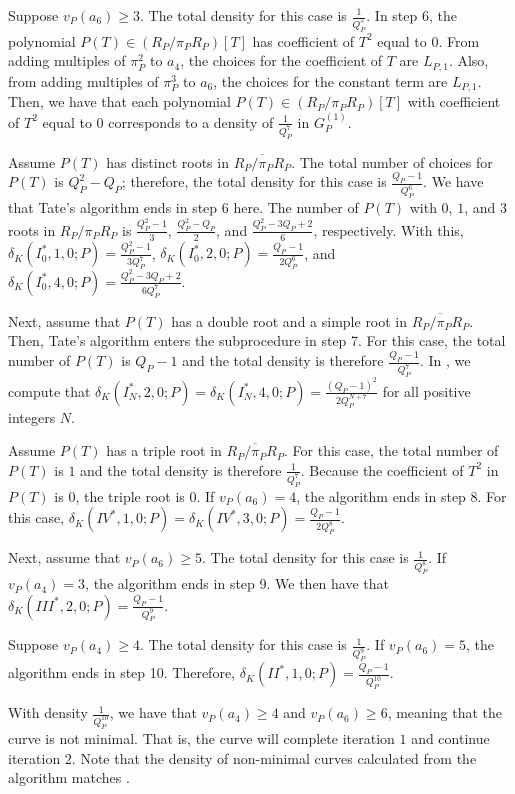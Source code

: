 \documentclass[12pt,letterpaper]{amsart}
\theoremstyle{definition}
\begin{document}
Suppose $v_P(a_6)\geq 3$. The total density for this case is $\frac{1}{Q_P^5}$. In step 6, the polynomial $P(T)\in (R_P/\pi_PR_P)[T]$ has coefficient of $T^2$ equal to $0$. From adding multiples of $\pi_P^2$ to $a_4$, the choices for the coefficient of $T$ are $L_{P,1}$. Also, from adding multiples of $\pi_P^3$ to $a_6$, the choices for the constant term are $L_{P,1}$. Then, we have that each polynomial $P(T)\in (R_P/\pi_PR_P)[T]$ with coefficient of $T^2$ equal to $0$ corresponds to a density of $\frac{1}{Q_P^7}$ in $G_P^{(1)}$.

Assume $P(T)$ has distinct roots in $\overline{R_P/\pi_P R_P}$. The total number of choices for $P(T)$ is $Q_P^2-Q_P$; therefore, the total density for this case is $\frac{Q_P-1}{Q_P^6}$. We have that Tate's algorithm ends in step 6 here. The number of $P(T)$ with $0$, $1$, and $3$ roots in $R_P/\pi_P R_P$ is $\frac{Q_P^2-1}{3}$, $\frac{Q_P^2-Q_P}{2}$, and $\frac{Q_P^2-3Q_P+2}{6}$, respectively. With this, $\delta_K(I_0^*, 1, 0; P)=\frac{Q_P^2-1}{3Q_P^7}$, $\delta_K(I_0^*, 2, 0; P)=\frac{Q_P-1}{2Q_P^6}$, and $\delta_K(I_0^*, 4, 0; P)=\frac{Q_P^2-3Q_P+2}{6Q_P^7}$.

Next, assume that $P(T)$ has a double root and a simple root in $\overline{R_P/\pi_P R_P}$. Then, Tate's algorithm enters the subprocedure in step 7. For this case, the total number of $P(T)$ is $Q_P-1$ and the total density is therefore $\frac{Q_P-1}{Q_P^7}$. In , we compute that $\delta_K(I_N^*,2,0;P)=\delta_K(I_N^*,4,0;P)=\frac{(Q_P-1)^2}{2Q_P^{N+7}}$ for all positive integers $N$.

Assume $P(T)$ has a triple root in $\overline{R_P/\pi_P R_P}$. For this case, the total number of $P(T)$ is $1$ and the total density is therefore $\frac{1}{Q_P^7}$. Because the coefficient of $T^2$ in $P(T)$ is $0$, the triple root is $0$. If $v_P(a_6)=4$, the algorithm ends in step 8. For this case, $\delta_K(IV^*, 1, 0; P)=\delta_K(IV^*, 3, 0; P) = \frac{Q_P-1}{2Q_P^8}$.

Next, assume that $v_P(a_6)\geq 5$. The total density for this case is $\frac{1}{Q_P^8}$. If $v_P(a_4)=3$, the algorithm ends in step 9. We then have that $\delta_K(III^*, 2, 0; P)=\frac{Q_P-1}{Q_P^9}$.

Suppose $v_P(a_4)\geq 4$. The total density for this case is $\frac{1}{Q_P^9}$. If $v_P(a_6)=5$, the algorithm ends in step 10. Therefore, $\delta_K(II^*,1,0; P)=\frac{Q_P-1}{Q_P^{10}}$.

With density $\frac{1}{Q_P^{10}}$, we have that $v_P(a_4)\geq 4$ and $v_P(a_6)\geq 6$, meaning that the curve is not minimal. That is, the curve will complete iteration $1$ and continue iteration $2$. Note that the density of non-minimal curves calculated from the algorithm matches .
\end{document}
